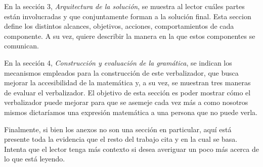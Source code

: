 En la sección 3, \textit{Arquitectura de la solución}, se muestra al lector cuáles partes están involucradas y que conjuntamente forman a la solución final. Esta seccion define los distintos alcances, objetivos, acciones, comportamientos de cada componente. A su vez, quiere describir la manera en la que estos componentes se comunican.

En la sección 4, \textit{Construcción y evaluación de la gramática}, se indican los mecanismos empleados para la construcción de este verbalizador, que busca mejorar la accesibilidad de la matemática y, a su vez, se muestran tres maneras de evaluar el verbalizador. El objetivo de esta sección es poder mostrar cómo el verbalizador puede mejorar para que se asemeje cada vez más a como nosotros mismos dictaríamos una expresión matemática a una persona que no puede verla.

Finalmente, si bien los anexos no son una sección en particular, aquí está presente toda la evidencia que el resto del trabajo cita y en la cual se basa. Intenta que el lector tenga más contexto si desea averiguar un poco más acerca de lo que está leyendo.
